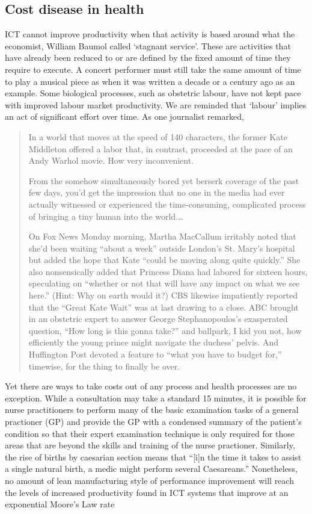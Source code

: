 \subsection{Cost disease in health}
ICT cannot improve productivity when that activity is based around what the economist, William Baumol called `stagnant service'\cite{RefWorks:322}. These are activities that have already been reduced to or are defined by the fixed amount of time they require to execute. A concert performer must still take the same amount of time to play a musical piece as when it was written a decade or a century ago as an example. Some biological processes, such as obstetric labour, have not kept pace with improved labour market productivity. We are reminded that `labour' implies an act of significant effort over time. As one journalist remarked,
\begin{quotation}
 In a world that moves at the speed of 140 characters, the former Kate Middleton offered a labor that, in contrast, proceeded at the pace of an Andy Warhol movie. How very inconvenient.

From the somehow simultaneously bored yet berserk coverage of the past few days, you'd get the impression that no one in the media had ever actually witnessed or experienced the time-consuming, complicated process of bringing a tiny human into the world.\ldots

On Fox News Monday morning, Martha MacCallum irritably noted that she'd been waiting ``about a week'' outside London's St. Mary's hospital but added the hope that Kate ``could be moving along quite quickly.'' She also nonsensically added that Princess Diana had labored for sixteen hours, speculating on ``whether or not that will have any impact on what we see here.'' (Hint: Why on earth would it?) CBS likewise impatiently reported that the ``Great Kate Wait'' was at last drawing to a close. ABC brought in an obstetric expert to answer George Stephanopoulos's exasperated question, ``How long is this gonna take?'' and ballpark, I kid you not, how efficiently the young prince might navigate the duchess' pelvis. And Huffington Post devoted a feature to ``what you have to budget for,'' timewise, for the thing to finally be over\cite{RefWorks:325}.
\end{quotation}    

Yet there are ways to take costs out of any process and health processes are no exception. While a consultation may take a standard 15 minutes, it is possible for nurse practitioners to perform many of the basic examination tasks of a general practioner (GP) and provide the GP with  a condensed summary of the patient's condition so that their expert examination technique is only required for those areas that are beyond the skills and training of the nurse practioner. Similarly, the rise of births by caesarian section means that ``[i]n the time it takes to assist a single natural birth, a medic might perform several Caesareans\cite{RefWorks:366}.'' Nonetheless, no amount of lean manufacturing style of performance improvement will reach the levels of increased productivity found in ICT systems that improve at an exponential Moore's Law rate


